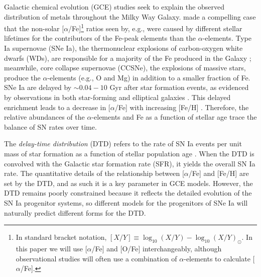\documentclass[twocolumn,twocolappendix]{aastex631}
\newcommand{\aFe}{[$\alpha$/Fe]\xspace}
\begin{document}
Galactic chemical evolution (GCE) studies seek to explain the observed distribution of metals throughout the Milky Way Galaxy. \citet{Tinsley1979-StellarLifetimes} made a compelling case that the non-solar \aFe\footnote{
    In standard bracket notation, $[X/Y]\equiv \log_{10}(X/Y) - \log_{10}(X/Y)_{\odot}$. In this paper we will use \aFe and [O/Fe] interchangeably, although observational studies will often use a combination of $\alpha$-elements to calculate \aFe.
} ratios seen by, e.g., \citet{Wallerstein1962-GDwarfAbundances} were caused by different stellar lifetimes for the contributors of the Fe-peak elements than the $\alpha$-elements. Type Ia supernovae (SNe Ia), the thermonuclear explosions of carbon-oxygen white dwarfs (WDs), are responsible for a majority of the Fe produced in the Galaxy \citep{Matteucci1986-SupernovaEnrichment}; meanwhile, core collapse supernovae (CCSNe), the explosions of massive stars, produce the $\alpha$-elements (e.g., O and Mg) in addition to a smaller fraction of Fe. SNe Ia are delayed by $\sim 0.04-10$ Gyr after star formation events, as evidenced by observations in both star-forming and elliptical galaxies \citep[e.g.,][]{Maza1976-SNStatistics}. This delayed enrichment leads to a decrease in \aFe with increasing [Fe/H] \citep{Matteucci1986-SupernovaEnrichment}. Therefore, the relative abundances of the $\alpha$-elements and Fe as a function of stellar age trace the balance of SN rates over time.

The {\it delay-time distribution} (DTD) refers to the rate of SN Ia events per unit mass of star formation as a function of stellar population age \citep[for a review, see Section 3.5 of][]{Maoz2014-Review}. When the DTD is convolved with the Galactic star formation rate (SFR), it yields the overall SN Ia rate. The quantitative details of the relationship between \aFe and [Fe/H] are set by the DTD, and as such it is a key parameter in GCE models. However, the DTD remains poorly constrained because it reflects the detailed evolution of the SN Ia progenitor systems, so different models for the progenitors of SNe Ia will naturally predict different forms for the DTD.
\end{document}
